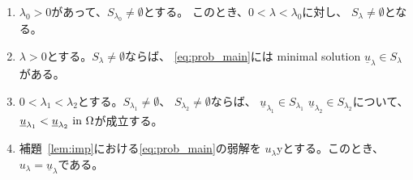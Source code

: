 \begin{lem}
 \begin{enumerate}[1.]
  \item $\lambda_0 > 0$があって、$S_{\lambda_0} \neq \emptyset$とする。
        このとき、$0 < \lambda < \lambda_0$に対し、
        $S_\lambda \neq \emptyset$となる。
  \item $\lambda > 0$とする。$S_\lambda \neq \emptyset$ならば、
        \ref{eq:prob_main}には minimal solution $\underline{u}_\lambda
        \in S_\lambda$がある。
  \item $0 < \lambda_1 < \lambda_2$とする。$S_{\lambda_1} \neq
        \emptyset$、
        $S_{\lambda_2} \neq \emptyset$ならば、
        $\underline{u}_{\lambda_1} \in S_{\lambda_1}$
        $\underline{u}_{\lambda_2} \in S_{\lambda_2}$について、
        $\underline{u}_{\lambda_1} < \underline{u}_{\lambda_2} ~\text{in}~
        \Omega$が成立する。
  \item 補題~\ref{lem:imp}における\ref{eq:prob_main}の弱解を
        $u_\lambda$yとする。このとき、$u_\lambda =
        \underline{u}_\lambda$である。
 \end{enumerate}
\end{lem}

